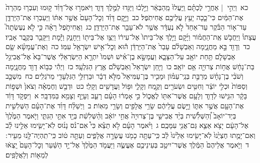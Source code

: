 \documentclass[18pt]{article}
\newcommand{\kri}[1]{\Afootnote{#1}}	%
\begin{document}
 {\loc כא~}וַיְהִ֣י  |  אַחֲרֵ֣י לֶכְתָּ֗ם וַֽיַּעֲלוּ֙ מֵֽהַבְּאֵ֔ר וַיֵּ֣לְכ֔וּ וַיַּגִּ֖דוּ לַמֶּ֣לֶךְ דָּוִ֑ד וַיֹּאמְר֣וּ אֶל־דָּוִ֗ד ק֣וּמוּ וְעִבְר֤וּ מְהֵרָה֙ אֶת־הַמַּ֔יִם כִּי־כָ֛כָה יָעַ֥ץ עֲלֵיכֶ֖ם אֲחִיתֹֽפֶל׃ \startlock
 {\loc כב~}וַיָּ֣קׇם דָּוִ֗ד וְכׇל־הָעָם֙ אֲשֶׁ֣ר אִתּ֔וֹ וַיַּעַבְר֖וּ אֶת־הַיַּרְדֵּ֑ן עַד־א֣וֹר הַבֹּ֗קֶר עַד־אַחַד֙ לֹ֣א נֶעְדָּ֔ר אֲשֶׁ֥ר לֹא־עָבַ֖ר אֶת־הַיַּרְדֵּֽן׃ \startlock
 {\loc כג~}וַאֲחִיתֹ֣פֶל רָאָ֗ה כִּ֣י לֹ֣א נֶעֶשְׂתָה֮ עֲצָתוֹ֒ וַיַּחֲבֹ֣שׁ אֶֽת־הַחֲמ֗וֹר וַיָּ֜קׇם וַיֵּ֤לֶךְ אֶל־בֵּיתוֹ֙ אֶל־עִיר֔וֹ וַיְצַ֥ו אֶל־בֵּית֖וֹ וַיֵּחָנַ֑ק וַיָּ֕מׇת וַיִּקָּבֵ֖ר בְּקֶ֥בֶר אָבִֽיו׃ \startlock
 {\loc כד~}וְדָוִ֖ד בָּ֣א מַחֲנָ֑יְמָה וְאַבְשָׁלֹ֗ם עָבַר֙ אֶת־הַיַּרְדֵּ֔ן ה֕וּא וְכׇל־אִ֥ישׁ יִשְׂרָאֵ֖ל עִמּֽוֹ׃ \startlock
 {\loc כה~}וְאֶת־עֲמָשָׂ֗א שָׂ֧ם אַבְשָׁלֹ֛ם תַּ֥חַת יוֹאָ֖ב עַל־הַצָּבָ֑א וַעֲמָשָׂ֣א בֶן־אִ֗ישׁ וּשְׁמוֹ֙ יִתְרָ֣א הַיִּשְׂרְאֵלִ֔י אֲשֶׁר־בָּא֙ אֶל־אֲבִיגַ֣ל בַּת־נָחָ֔שׁ אֲח֥וֹת צְרוּיָ֖ה אֵ֥ם יוֹאָֽב׃ \startlock
 {\loc כו~}וַיִּ֤חַן יִשְׂרָאֵל֙ וְאַבְשָׁלֹ֔ם אֶ֖רֶץ הַגִּלְעָֽד׃ \startlock
 {\loc כז~}וַיְהִ֕י כְּב֥וֹא דָוִ֖ד מַחֲנָ֑יְמָה וְשֹׁבִ֨י בֶן־נָחָ֜שׁ מֵרַבַּ֣ת בְּנֵֽי־עַמּ֗וֹן וּמָכִ֤יר בֶּן־עַמִּיאֵל֙ מִלֹּ֣א דְבָ֔ר וּבַרְזִלַּ֥י הַגִּלְעָדִ֖י מֵרֹגְלִֽים׃ \startlock
 {\loc כח~}מִשְׁכָּ֤ב וְסַפּוֹת֙ וּכְלִ֣י יוֹצֵ֔ר וְחִטִּ֥ים וּשְׂעֹרִ֖ים וְקֶ֣מַח וְקָלִ֑י וּפ֥וֹל וַעֲדָשִׁ֖ים וְקָלִֽי׃ \startlock
 {\loc כט~}וּדְבַ֣שׁ וְחֶמְאָ֗ה וְצֹאן֙ וּשְׁפ֣וֹת בָּקָ֔ר הִגִּ֧ישׁוּ לְדָוִ֛ד וְלָעָ֥ם אֲשֶׁר־אִתּ֖וֹ לֶאֱכ֑וֹל כִּ֣י אָמְר֔וּ הָעָ֗ם רָעֵ֛ב וְעָיֵ֥ף וְצָמֵ֖א בַּמִּדְבָּֽר׃ 
\startlock
 {\loc א~}וַיִּפְקֹ֣ד דָּוִ֔ד אֶת־הָעָ֖ם אֲשֶׁ֣ר אִתּ֑וֹ וַיָּ֣שֶׂם עֲלֵיהֶ֔ם שָׂרֵ֥י אֲלָפִ֖ים וְשָׂרֵ֥י מֵאֽוֹת׃ \startlock
 {\loc ב~}וַיְשַׁלַּ֨ח דָּוִ֜ד אֶת־הָעָ֗ם הַשְּׁלִשִׁ֤ית בְּיַד־יוֹאָב֙ וְ֠הַשְּׁלִשִׁ֠ית בְּיַ֨ד אֲבִישַׁ֤י בֶּן־צְרוּיָה֙ אֲחִ֣י יוֹאָ֔ב וְהַ֨שְּׁלִשִׁ֔ת בְּיַ֖ד אִתַּ֣י הַגִּתִּ֑י \edtext{{ס}    }{\kri{פסקא באמצע פסוק}שמואל ב יח ב} וַיֹּ֤אמֶר הַמֶּ֙לֶךְ֙ אֶל־הָעָ֔ם יָצֹ֥א אֵצֵ֛א גַּם־אֲנִ֖י עִמָּכֶֽם׃ \startlock
 {\loc ג~}וַיֹּ֨אמֶר הָעָ֜ם לֹ֣א תֵצֵ֗א כִּי֩ אִם־נֹ֨ס נָנ֜וּס לֹֽא־יָשִׂ֧ימוּ אֵלֵ֣ינוּ לֵ֗ב וְאִם־יָמֻ֤תוּ חֶצְיֵ֙נוּ֙ לֹֽא־יָשִׂ֤ימוּ אֵלֵ֙ינוּ֙ לֵ֔ב כִּֽי־עַתָּ֥ה כָמֹ֖נוּ עֲשָׂרָ֣ה אֲלָפִ֑ים וְעַתָּ֣ה ט֔וֹב כִּֽי־תִֽהְיֶה־לָּ֥נוּ מֵעִ֖יר  \edtext{(לעזיר)}{\kri{קרי: לַעְזֽוֹר}} ׃ \startlock
 {\loc ד~}וַיֹּ֤אמֶר אֲלֵיהֶם֙ הַמֶּ֔לֶךְ אֲשֶׁר־יִיטַ֥ב בְּעֵינֵיכֶ֖ם אֶעֱשֶׂ֑ה וַיַּעֲמֹ֤ד הַמֶּ֙לֶךְ֙ אֶל־יַ֣ד הַשַּׁ֔עַר וְכׇל־הָעָם֙ יָֽצְא֔וּ לְמֵא֖וֹת וְלַאֲלָפִֽים׃ \startlock
\end{document}
